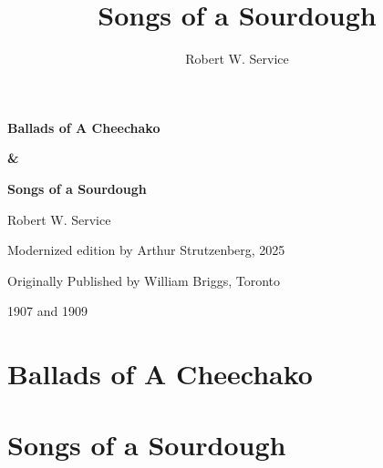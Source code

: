\documentclass[10pt]{book}
\title{Songs of a Sourdough}
\author{Robert W. Service}
\begin{document}
\begin{titlepage}
    \centering
    {\Huge\bfseries Ballads of A Cheechako\par}
    {\Huge\bfseries \&\par}
    {\Huge\bfseries Songs of a Sourdough\par}
    \vspace{2cm}

    {\Large Robert W. Service\par}
    \vfill
    {\large Modernized edition by Arthur Strutzenberg, 2025\par}
    \vspace{1cm}    {\large Originally Published by William Briggs, Toronto\par}
    {\large 1907 and 1909}
\end{titlepage}

\frontmatter
\tableofcontents
\newpage

\mainmatter


\chapter*{Ballads of A Cheechako}
\cleardoublepage
{}


\chapter*{Songs of a Sourdough}
\cleardoublepage
{}

\end{document}
